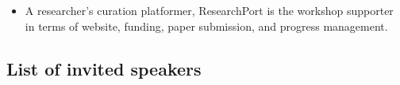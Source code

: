 \documentclass{article}
\def\c#1{\textcolor{gray}{#1}}
\begin{document}
\begin{itemize}
    \item A researcher’s curation platformer, ResearchPort is the workshop supporter in terms of website, funding, paper submission, and progress management.
\end{itemize}

\subsection{List of invited speakers}
\end{document}
